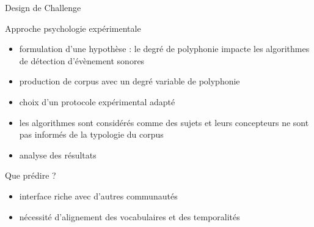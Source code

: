 \begin{frame}{Design de Challenge}
\begin{block}{Approche  \og psychologie expérimentale \fg}
\begin{itemize}
\item formulation d'une hypothèse : le degré de polyphonie impacte les algorithmes de détection d'évènement sonores
\item production de corpus avec un degré variable de polyphonie
\item choix d'un protocole expérimental adapté
\item les algorithmes sont considérés comme des sujets et leurs concepteurs ne sont pas informés de la typologie du corpus
\item analyse des résultats
\end{itemize}
\end{block} 
\end{frame}

\begin{frame}{Que prédire ?}
\begin{center}
\end{center}
\vspace{.8cm}
\begin{itemize}
\item interface riche avec d'autres communautés
\item nécessité d'alignement des vocabulaires et des temporalités
\end{itemize}
\end{frame}

